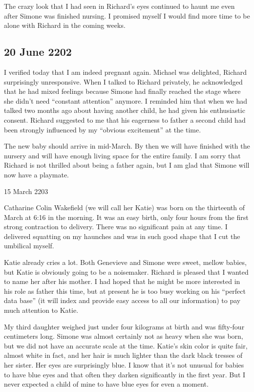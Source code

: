 \documentclass[]{article}
\begin{document}
The crazy look that I had seen in Richard’s eyes continued to haunt me even after Simone was finished nursing. I promised myself I would find more time to be alone with Richard in the coming weeks.

\subsection{20 June 2202}

I verified today that I am indeed pregnant again. Michael was delighted, Richard surprisingly unresponsive. When I talked to Richard privately, he acknowledged that he had mixed feelings because Simone had finally reached the stage where she didn’t need “constant attention” anymore. I reminded him that when we had talked two months ago about having another child, he had given his enthusiastic consent. Richard suggested to me that his eagerness to father a second child had been strongly influenced by my “obvious excitement” at the time.

The new baby should arrive in mid-March. By then we will have finished with the nursery and will have enough living space for the entire family. I am sorry that Richard is not thrilled about being a father again, but I am glad that Simone will now have a playmate.

15 March 2203

Catharine Colin Wakefield (we will call her Katie) was born on the thirteenth of March at 6:16 in the morning. It was an easy birth, only four hours from the first strong contraction to delivery. There was no significant pain at any time. I delivered squatting on my haunches and was in such good shape that I cut the umbilical myself.

Katie already cries a lot. Both Genevieve and Simone were sweet, mellow babies, but Katie is obviously going to be a noisemaker. Richard is pleased that I wanted to name her after his mother. I had hoped that he might be more interested in his role as father this time, but at present he is too busy working on his “perfect data base” (it will index and provide easy access to all our information) to pay much attention to Katie.

My third daughter weighed just under four kilograms at birth and was fifty-four centimeters long. Simone was almost certainly not as heavy when she was born, but we did not have an accurate scale at the time. Katie’s skin color is quite fair, almost white in fact, and her hair is much lighter than the dark black tresses of her sister. Her eyes are surprisingly blue. I know that it’s not unusual for babies to have blue eyes and that often they darken significantly in the first year. But I never expected a child of mine to have blue eyes for even a moment.
\end{document}
